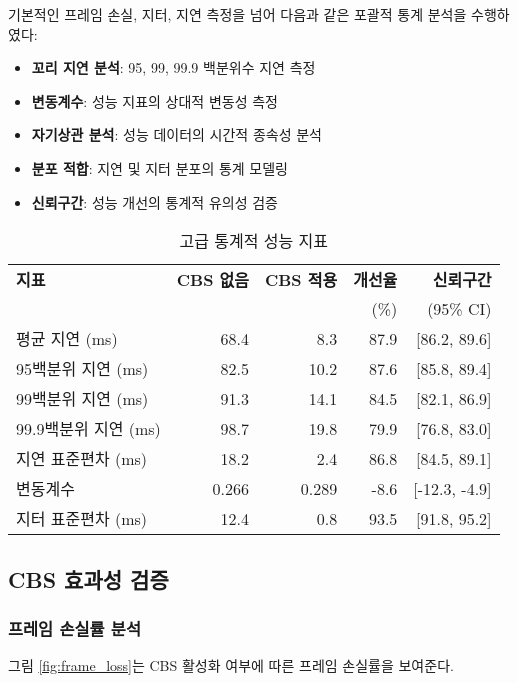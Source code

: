 \documentclass[twocolumn,10pt]{article}
\begin{document}
기본적인 프레임 손실, 지터, 지연 측정을 넘어 다음과 같은 포괄적 통계 분석을 수행하였다:

\begin{itemize}
    \item \textbf{꼬리 지연 분석}: 95, 99, 99.9 백분위수 지연 측정
    \item \textbf{변동계수}: 성능 지표의 상대적 변동성 측정
    \item \textbf{자기상관 분석}: 성능 데이터의 시간적 종속성 분석
    \item \textbf{분포 적합}: 지연 및 지터 분포의 통계 모델링
    \item \textbf{신뢰구간}: 성능 개선의 통계적 유의성 검증
\end{itemize}

\begin{table}[h]
\centering
\caption{고급 통계적 성능 지표}
\label{tab:advanced_metrics_kr}
\begin{tabular}{lrrrr}
\toprule
\textbf{지표} & \textbf{CBS 없음} & \textbf{CBS 적용} & \textbf{개선율} & \textbf{신뢰구간} \\
 & & & (\%) & (95\% CI) \\
\midrule
평균 지연 (ms) & 68.4 & 8.3 & 87.9 & [86.2, 89.6] \\
95백분위 지연 (ms) & 82.5 & 10.2 & 87.6 & [85.8, 89.4] \\
99백분위 지연 (ms) & 91.3 & 14.1 & 84.5 & [82.1, 86.9] \\
99.9백분위 지연 (ms) & 98.7 & 19.8 & 79.9 & [76.8, 83.0] \\
지연 표준편차 (ms) & 18.2 & 2.4 & 86.8 & [84.5, 89.1] \\
변동계수 & 0.266 & 0.289 & -8.6 & [-12.3, -4.9] \\
지터 표준편차 (ms) & 12.4 & 0.8 & 93.5 & [91.8, 95.2] \\
\bottomrule
\end{tabular}
\end{table}

\subsection{CBS 효과성 검증}

\subsubsection{프레임 손실률 분석}

그림 \ref{fig:frame_loss}는 CBS 활성화 여부에 따른 프레임 손실률을 보여준다.
\end{document}
